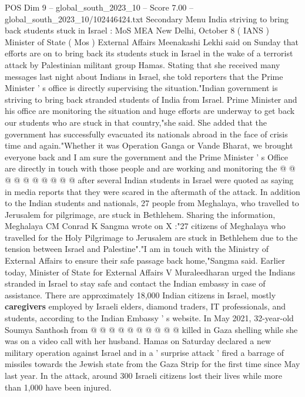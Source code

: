 \begin{textsample}{POS Dim 9 – global\_south\_2023\_10 – Score 7.00 – global\_south\_2023\_10/102446424.txt}  \label{ex:f9_pos_031}
Secondary Menu India striving to bring back students stuck in Israel : MoS MEA New Delhi, October 8 ( IANS ) Minister of State ( Mos ) External Affairs Meenakashi Lekhi said on Sunday that efforts are on to bring back its students stuck in Israel in the wake of a terrorist attack by Palestinian militant group Hamas.
Stating that she received many messages last night about Indians in Israel, she told reporters that the Prime Minister ' s office is directly supervising the situation."Indian government is striving to bring back stranded students of India from Israel.
Prime Minister and his office are monitoring the situation and huge efforts are underway to get back our students who are stuck in that country,"she said.
She added that the government has successfully evacuated its nationals abroad in the face of crisis time and again."Whether it was Operation Ganga or Vande Bharat, we brought everyone back and I am sure the government and the Prime Minister ' s Office are directly in touch with those people and are working and monitoring the @ @ @ @ @ @ @ @ @ @ after several Indian students in Israel were quoted as saying in media reports that they were scared in the aftermath of the attack.
In addition to the Indian students and nationals, 27 people from Meghalaya, who travelled to Jerusalem for pilgrimage, are stuck in Bethlehem.
Sharing the information, Meghalaya CM Conrad K Sangma wrote on X :"27 citizens of Meghalaya who travelled for the Holy Pilgrimage to Jerusalem are stuck in Bethlehem due to the tension between Israel and Palestine"."I am in touch with the Ministry of External Affairs to ensure their safe passage back home,"Sangma said.
Earlier today, Minister of State for External Affairs V Muraleedharan urged the Indians stranded in Israel to stay safe and contact the Indian embassy in case of assistance.
There are approximately 18,000 Indian citizens in Israel, mostly \textbf{caregivers} employed by Israeli elders, diamond traders, IT professionals, and students, according to the Indian Embassy ' s website.
In May 2021, 32-year-old Soumya Santhosh from @ @ @ @ @ @ @ @ @ @ killed in Gaza shelling while she was on a video call with her husband.
Hamas on Saturday declared a new military operation against Israel and in a ' surprise attack ' fired a barrage of missiles towards the Jewish state from the Gaza Strip for the first time since May last year.
In the attack, around 300 Israeli citizens lost their lives while more than 1,000 have been injured.

\end{textsample}
